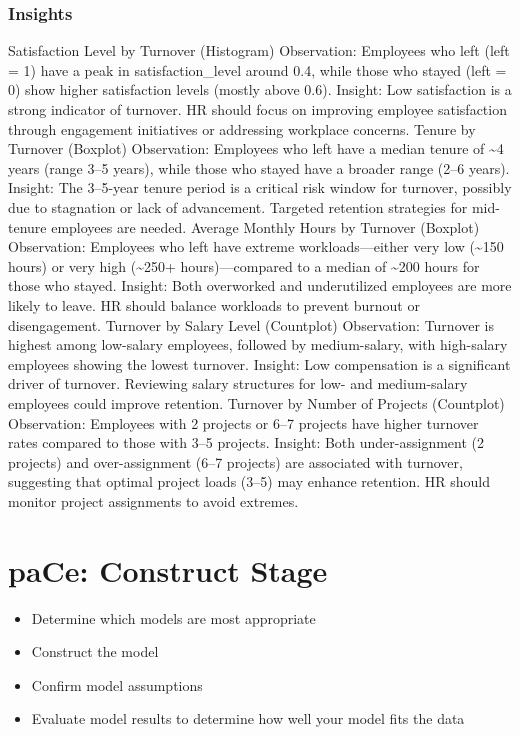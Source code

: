 \documentclass[11pt]{article}
\providecommand{\tightlist}{%
      \setlength{\itemsep}{0pt}\setlength{\parskip}{0pt}}
\begin{document}
    \hypertarget{insights}{%
\subsubsection{Insights}\label{insights}}

    Satisfaction Level by Turnover (Histogram) Observation: Employees who
left (left = 1) have a peak in satisfaction\_level around 0.4, while
those who stayed (left = 0) show higher satisfaction levels (mostly
above 0.6). Insight: Low satisfaction is a strong indicator of turnover.
HR should focus on improving employee satisfaction through engagement
initiatives or addressing workplace concerns. Tenure by Turnover
(Boxplot) Observation: Employees who left have a median tenure of
\textasciitilde4 years (range 3--5 years), while those who stayed have a
broader range (2--6 years). Insight: The 3--5-year tenure period is a
critical risk window for turnover, possibly due to stagnation or lack of
advancement. Targeted retention strategies for mid-tenure employees are
needed. Average Monthly Hours by Turnover (Boxplot) Observation:
Employees who left have extreme workloads---either very low
(\textasciitilde150 hours) or very high (\textasciitilde250+
hours)---compared to a median of \textasciitilde200 hours for those who
stayed. Insight: Both overworked and underutilized employees are more
likely to leave. HR should balance workloads to prevent burnout or
disengagement. Turnover by Salary Level (Countplot) Observation:
Turnover is highest among low-salary employees, followed by
medium-salary, with high-salary employees showing the lowest turnover.
Insight: Low compensation is a significant driver of turnover. Reviewing
salary structures for low- and medium-salary employees could improve
retention. Turnover by Number of Projects (Countplot) Observation:
Employees with 2 projects or 6--7 projects have higher turnover rates
compared to those with 3--5 projects. Insight: Both under-assignment (2
projects) and over-assignment (6--7 projects) are associated with
turnover, suggesting that optimal project loads (3--5) may enhance
retention. HR should monitor project assignments to avoid extremes.

    \hypertarget{pace-construct-stage}{%
\section{paCe: Construct Stage}\label{pace-construct-stage}}

\begin{itemize}
\tightlist
\item
  Determine which models are most appropriate
\item
  Construct the model
\item
  Confirm model assumptions
\item
  Evaluate model results to determine how well your model fits the data
\end{itemize}
\end{document}
